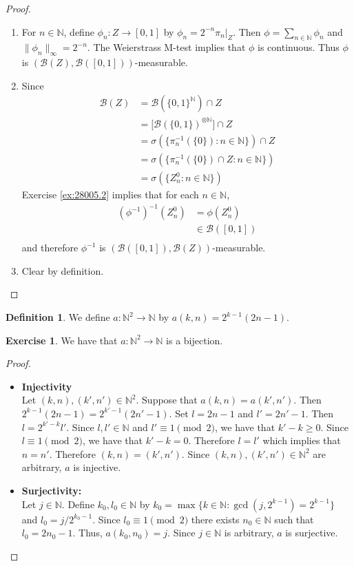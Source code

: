 \documentclass{book}
\theoremstyle{definition}
\newtheorem{defn}[definition]{Definition}
\newtheorem{ex}[definition]{Exercise}
\newcommand{\sig}{\sigma}
\newcommand{\N}{\mathbb{N}}
\newcommand{\MB}{\mathcal{B}}
\newcommand{\rex}[1]{Exercise \ref{ex:#1}}
\DeclareMathOperator*{\0}{\mbf{0}}
\DeclareMathOperator*{\1}{\mbf{1}}
\begin{document}
	\begin{proof}\
		\begin{enumerate}
			\item For $n \in \N$, define $\phi_n: Z \rightarrow [0, 1]$ by $\phi_n = 2^{-n}\pi_n|_{Z}$. Then $\phi = \sum\limits_{n \in \N} \phi_n$ and $\|\phi_n\|_{\infty} = 2^{-n}$. The Weierstrass M-test implies that $\phi$ is continuous. Thus $\phi$ is $(\MB(Z), \MB([0,1]))$-measurable. \\
			\item Since 
			\begin{align*}
				\MB(Z) 
				& = \MB(\{0, 1\}^{\N}) \cap Z \\
				& = \bigg[ \MB(\{0,1\})^{\otimes \N} \bigg] \cap Z \\
				& = \sig(\{\pi_n^{-1}(\{0\}): n \in \N\}) \cap Z \\
				& = \sig (\{\pi_n^{-1}(\{0\}) \cap Z: n \in \N\} )\\
				& = \sig (\{Z_n^0: n \in \N\})
			\end{align*}
			\rex{28005.2} implies that for each $n \in \N$, 
			\begin{align*}
				(\phi^{-1})^{-1} (Z_n^0) 
				& = \phi(Z_n^0) \\
				& \in \MB([0,1]) \\
			\end{align*}
			and therefore $\phi^{-1}$ is $(\MB([0,1]), \MB(Z))$-measurable.
			\item Clear by definition.
		\end{enumerate}
	\end{proof}
	
	\begin{defn}
		We define $a: \N^2 \rightarrow \N$ by $a(k,n) = 2^{k-1}(2n-1)$. 
	\end{defn}
	
	\begin{ex}
		We have that $a: \N^2 \rightarrow \N$ is a bijection.
	\end{ex}
	
	\begin{proof}\
		\begin{itemize}
			\item \textbf{Injectivity} \\ 
			Let $(k,n), (k', n') \in \N^2$. Suppose that $a(k,n) = a(k',n')$. Then $2^{k-1}(2n-1) = 2^{k'-1}(2n'-1)$. Set $l = 2n-1$ and $l' = 2n'-1$. Then $l = 2^{k'-k}l'$. Since $l,l' \in \N$ and $l' \equiv 1 \pmod{2}$, we have that $k'-k \geq 0$. Since $l \equiv 1 \pmod{2}$, we have that $k'-k = 0$. Therefore $l = l'$ which implies that $n = n'$. Therefore $(k,n) = (k', n')$. Since  $(k,n), (k', n') \in \N^2$ are arbitrary, $a$ is injective.
			\item \textbf{Surjectivity:} \\
			Let $j \in \N$. Define $k_0,l_0 \in \N$ by $k_0 = \max \{k \in \N: \gcd(j, 2^{k-1}) = 2^{k-1}\}$ and $l_0 = j/2^{k_0-1}$. Since $l_0 \equiv 1 \pmod{2}$ there exists $n_0 \in \N$ such that $l_0 = 2n_0-1$. Thus, $a(k_0, n_0) = j$. Since $j \in \N$ is arbitrary, $a$ is surjective.
		\end{itemize}
	\end{proof}
	
\end{document}
